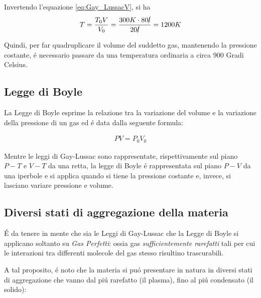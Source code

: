 \documentclass[17pt]{extarticle}
\begin{document}
Invertendo l'equazione \ref{eq:Gay_LussacV}, si ha 
\begin{eqnarray}
	T = \frac{T_0V}{V_0} = \frac{300K\cdot 80\cancel{l} }{20 \cancel{l} } = 1200 K
\end{eqnarray}

Quindi, per far quadruplicare il volume del suddetto gas, mantenendo la pressione costante, \'e necessario passare da una temperatura ordinaria a circa 900 Gradi Celsius.

\subsection{Legge di Boyle}

La Legge di Boyle esprime la relazione tra la variazione del volume e la variazione della pressione di un gas ed \'e data dalla seguente formula:

\begin{eqnarray}
	PV = P_0V_0
\end{eqnarray}

Mentre le leggi di Gay-Lussac sono rappresentate, rispettivamente sul piano $P-T$ e $V-T$ da una retta, la legge di Boyle \'e rappresentata sul piano $P-V$ da una iperbole e si applica quando si tiene la pressione costante e, invece, si lasciano variare pressione e volume.

\subsection{Diversi stati di aggregazione della materia}
\'E da tenere in mente che sia le Leggi di Gay-Lussac che la Legge di Boyle si applicano soltanto su \emph{Gas Perfetti}: ossia gas \emph{sufficientemente rarefatti} tali per cui le interazioni tra differenti molecole del gas stesso risultino trascurabili.

A tal proposito, \'e noto che la materia si pu\'o presentare in natura in diversi stati di aggregazione che vanno dal pi\'u rarefatto (il plasma), fino al pi\'u condensato (il solido):
\end{document}
